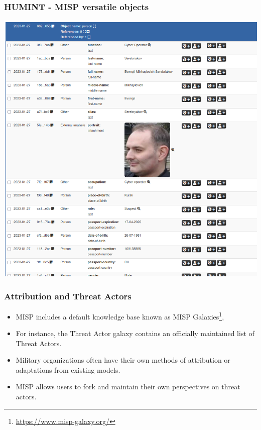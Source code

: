 \begin{frame}
    \frametitle{HUMINT - MISP versatile objects}
\begin{center}
    \includegraphics[scale=0.3]{gru-1.png}
\end{center}
\end{frame}

\begin{frame}
    \frametitle{Attribution and Threat Actors}
\begin{itemize}
       \item MISP includes a default knowledge base known as MISP Galaxies\footnote{\url{https://www.misp-galaxy.org/}},
       \item For instance, the Threat Actor galaxy contains an officially maintained list of Threat Actors.
       \item Military organizations often have their own methods of attribution or adaptations from existing models.
       \item MISP allows users to fork and maintain their own perspectives on threat actors.                                       
\end{itemize}
\end{frame}

